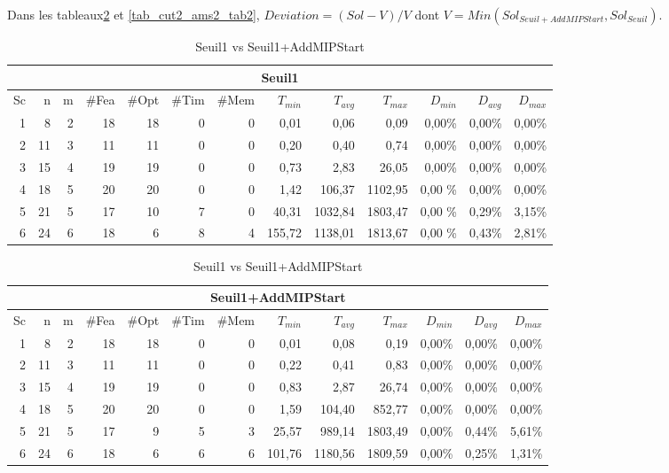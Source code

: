 \documentclass[twoside,fleqn]{EPURapport}
\begin{document}
Dans les tableaux\ref{tab_cut2_ams1_tab2} et \ref{tab_cut2_ams2_tab2}, $Deviation = (Sol-V)/V$ dont $V =Min(Sol_{Seuil+AddMIPStart},Sol_{Seuil})$.

\begin{table}[h]
    \centering
    \begin{tabular}{|r|r|r|r|r|r|r|r|r|r|r|r|r|}
    	\hline
    	\multicolumn{13}{|c|}{Seuil1}\\ \hline
Sc &	n	&m	&\#Fea	&\#Opt	&\#Tim &\#Mem	&$T_{min}$ & $T_{avg}$	& $T_{max}$ & $D_{min}$ & $D_{avg}$	& $D_{max}$ \\ \hline
1&	8 &	2&	18&	18&	0&	0&	0,01&	0,06&	0,09	&0,00\%&	0,00\%&	0,00\%    \\ \hline
2&	11&	3&	11&	11&	0&	0&	0,20&	0,40&	0,74	&0,00\%&	0,00\%&	0,00\%     \\ \hline
3&	15&	4&	19&	19&	0&	0&	0,73&	2,83&	26,05	&0,00\%&	0,00\%&	0,00\%  \\ \hline
4 &	18	&5	&20	    &20	&0	&0	&1,42	&106,37	&1102,95	&0,00	\%&0,00\%&	0,00\% \\ \hline
5 &	21	&5	&17	    &10	&7	&0	&40,31	&1032,84&	1803,47	&0,00	\%&0,29\%&	3,15\% \\ \hline
6 &	24	&6	&18	    &6	&8	&4	&155,72	&1138,01&	1813,67	&0,00	\%&0,43\%&	2,81\% \\ \hline
    \end{tabular}
\medskip \par
    \begin{tabular}{|r|r|r|r|r|r|r|r|r|r|r|r|r|}
    	\hline
    	\multicolumn{13}{|c|}{Seuil1+AddMIPStart}\\ \hline
Sc &	n	&m	&\#Fea	&\#Opt	&\#Tim &\#Mem	&$T_{min}$ & $T_{avg}$	& $T_{max}$ & $D_{min}$ & $D_{avg}$	& $D_{max}$ \\ \hline
1&	8 &	2&	18&	18&	0&	0&	0,01&	0,08&	0,19	&0,00\%&	0,00\%&	0,00\%    \\ \hline
2&	11&	3&	11&	11&	0&	0&	0,22&	0,41&	0,83	&0,00\%&	0,00\%&	0,00\%     \\ \hline
3&	15&	4&	19&	19&	0&	0&	0,83&	2,87&	26,74	&0,00\%&	0,00\%&	0,00\%  \\ \hline
4 &	18	&5	&20	  &20	&0	&0	&1,59	&104,40	&852,77	    &0,00\%&	0,00\%&	0,00\% \\ \hline
5 &	21	&5	&17	  &9	&5	&3	&25,57	&989,14	&1803,49	&0,00\%&	0,44\%&	5,61\% \\ \hline
6 &	24	&6	&18	  &6	&6	&6	&101,76	&1180,56&	1809,59	&0,00\%&	0,25\%&	1,31\% \\ \hline

    \end{tabular}
    \caption{Seuil1 vs Seuil1+AddMIPStart}
    \label{tab_cut2_ams1_tab2}
\end{table}
\end{document}
